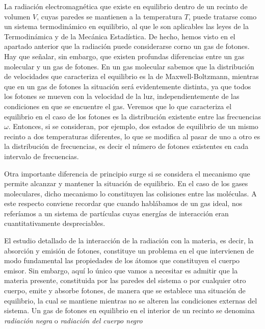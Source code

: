 La radiación electromagnética que existe en equilibrio dentro de un recinto de volumen $V$, cuyas paredes se mantienen a la temperatura $T$, puede tratarse como un sistema termodinámico en equilibrio, al que le son aplicables las leyes de la Termodinámica y de la Mecánica Estadística.
De hecho, hemos visto en el apartado anterior que la radiación puede considerarse corno un gas de fotones.
Hay que señalar, sin embargo, que existen profundas diferencias entre un gas molecular y un gas de fotones.
En un gas molecular sabemos que la distribución de velocidades que caracteriza el equilibrio es la de Maxwell-Boltzmann, mientras que en un gas de fotones la situación será evidentemente distinta, ya que todos los fotones se mueven con la velocidad de la luz, independientemente de las condiciones en que se encuentre el gas.
Veremos que lo que caracteriza el equilibrio en el caso de los fotones es la distribución existente entre las frecuencias $\omega$.
Entonces, si se consideran, por ejemplo, dos estados de equilibrio de un mismo recinto a dos temperaturas diferentes, lo que se modifica al pasar de uno a otro es la distribución de frecuencias, es decir el número de fotones existentes en cada intervalo de frecuencias.

Otra importante diferencia de principio surge si se considera el mecanismo que permite alcanzar y mantener la situación de equilibrio.
En el caso de los gases moleculares, dicho mecanismo lo constituyen las colisiones entre las moléculas.
A este respecto conviene recordar que cuando hablábamos de un gas ideal, nos referíamos a un sistema de partículas cuyas energías de interacción eran cuantitativamente despreciables.

El estudio detallado de la interacción de la radiación con la materia, es decir, la absorción y emisión de fotones, constituye un problema en el que intervienen de modo fundamental las propiedades de los átomos que constituyen el cuerpo emisor.
Sin embargo, aquí lo único que vamos a necesitar es admitir que la materia presente, constituida por las paredes del sistema o por cualquier otro cuerpo, emite y absorbe fotones, de manera que se establece una situación de equilibrio, la cual se mantiene mientras no se alteren las condiciones externas del sistema.
Un gas de fotones en equilibrio en el interior de un recinto se denomina \emph{radiación negra} o \emph{radiación del cuerpo negro}

